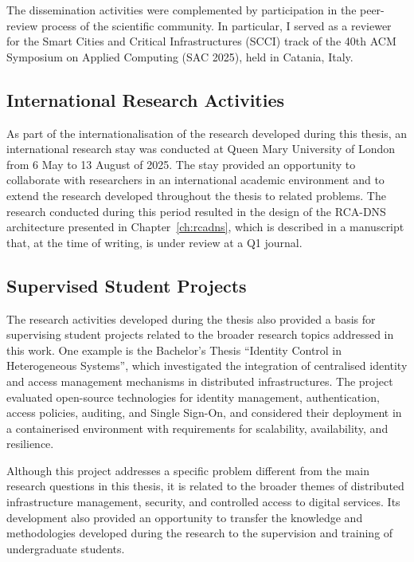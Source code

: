 \documentclass[
A4paper,                %
twoside,                %
openright,              %
chapterprefix=true,     %
12pt,                   %
headings=normal,        %
titlepage=on            %
]{book}
\begin{document}
The dissemination activities were complemented by participation in the peer-review process of the scientific community. In particular, I served as a reviewer for the Smart Cities and Critical Infrastructures (SCCI) track of the 40th ACM Symposium on Applied Computing (SAC 2025), held in Catania, Italy.

\subsection{International Research Activities}
\label{sc:conclusion_internationalisation}

As part of the internationalisation of the research developed during this thesis, an international research stay was conducted at Queen Mary University of London from 6 May to 13 August of 2025. The stay provided an opportunity to collaborate with researchers in an international academic environment and to extend the research developed throughout the thesis to related problems. The research conducted during this period resulted in the design of the RCA-DNS architecture presented in Chapter~\ref{ch:rcadns}, which is described in a manuscript that, at the time of writing, is under review at a Q1 journal.

\subsection{Supervised Student Projects}
\label{sc:conclusion_student_projects}

The research activities developed during the thesis also provided a basis for supervising student projects related to the broader research topics addressed in this work. One example is the Bachelor's Thesis ``Identity Control in Heterogeneous Systems'', which investigated the integration of centralised identity and access management mechanisms in distributed infrastructures. The project evaluated open-source technologies for identity management, authentication, access policies, auditing, and Single Sign-On, and considered their deployment in a containerised environment with requirements for scalability, availability, and resilience.

Although this project addresses a specific problem different from the main research questions in this thesis, it is related to the broader themes of distributed infrastructure management, security, and controlled access to digital services. Its development also provided an opportunity to transfer the knowledge and methodologies developed during the research to the supervision and training of undergraduate students.
\end{document}
